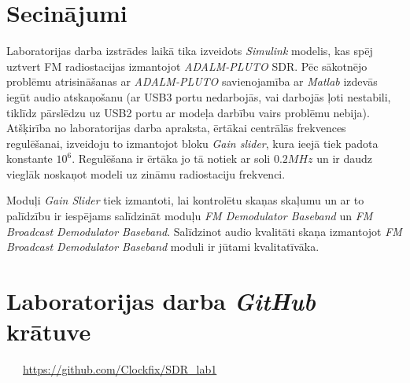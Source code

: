 \documentclass[a4paper,12pt]{extarticle}    %
\begin{document}
\section{Secinājumi}
%
Laboratorijas darba izstrādes laikā tika izveidots \textit{Simulink} modelis, kas spēj uztvert FM radiostacijas izmantojot \textit{ADALM-PLUTO} SDR. Pēc sākotnējo problēmu atrisināšanas ar \textit{ADALM-PLUTO} savienojamība ar \textit{Matlab} izdevās iegūt audio atskaņošanu (ar USB3 portu nedarbojās, vai darbojās ļoti nestabili, tiklīdz pārslēdzu uz USB2 portu ar modeļa darbību vairs problēmu nebija). Atšķirība no laboratorijas darba apraksta, ērtākai centrālās frekvences regulēšanai, izveidoju  to izmantojot bloku \textit{Gain slider}, kura ieejā tiek padota konstante $10^{6}$. Regulēšana ir ērtāka jo tā notiek ar soli $0.2MHz$ un ir daudz vieglāk noskaņot modeli uz zināmu radiostaciju frekvenci.\par 
Moduļi \textit{Gain Slider} tiek izmantoti, lai kontrolētu skaņas skaļumu un ar to palīdzību ir iespējams salīdzināt moduļu \textit{FM Demodulator Baseband} un \textit{FM Broadcast Demodulator Baseband}. Salīdzinot audio kvalitāti skaņa izmantojot \textit{FM Broadcast Demodulator Baseband} moduli ir jūtami kvalitatīvāka.\par 
%
\section{Laboratorijas darba \textit{GitHub} krātuve}
%
\href{https://github.com/Clockfix/SDR\_lab1}
	{} \ \ \ 
\href{https://github.com/Clockfix/SDR\_lab1}
	{https://github.com/Clockfix/SDR\_lab1}
%
\end{document}
